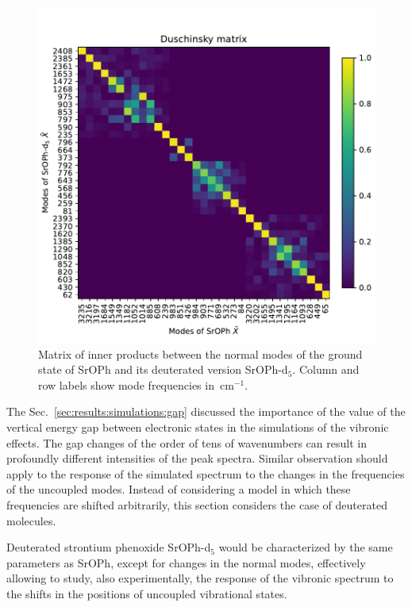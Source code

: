 \documentclass{article}
\begin{document}
\begin{figure}
    \begin{center}
        \includegraphics[width=12 cm]{./figures/SrOPh-duszynski.pdf}
    \end{center}
    \caption{
        Matrix of inner products between the normal modes of the ground state
        of SrOPh and its deuterated version SrOPh-d$_5$. Column and row labels
        show mode frequencies in~cm$^{-1}$.
    }
    \label{fig:sroph_duszynski}
\end{figure}

The Sec.~\ref{sec:results:simulations:gap} discussed the importance of the
value of the vertical energy gap between electronic states in the simulations
of the vibronic effects. The gap changes of the order of tens of wavenumbers
can result in profoundly different intensities of the peak spectra. Similar
observation should apply to the response of the simulated spectrum to the
changes in the frequencies of the uncoupled modes. Instead of considering a
model in which these frequencies are shifted arbitrarily, this section
considers the case of deuterated molecules.

Deuterated strontium phenoxide SrOPh-d$_5$ would be characterized by the same
parameters as SrOPh, except for changes in the normal modes, effectively
allowing to study, also experimentally, the response of the vibronic spectrum
to the shifts in the positions of uncoupled vibrational states.
\end{document}
